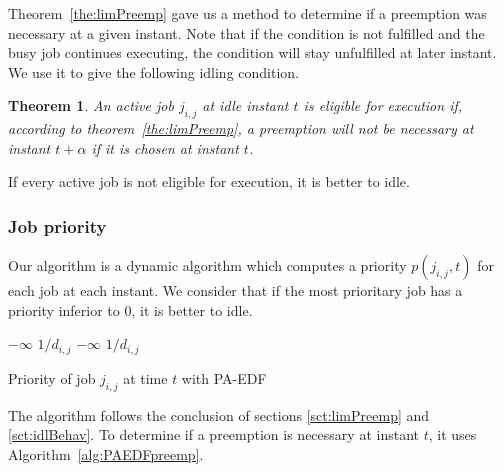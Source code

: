 \documentclass[a4paper,10pt]{article}
\newtheorem{theorem}{Theorem}
\begin{document}
        Theorem~\ref{the:limPreemp} gave us a method to determine if a preemption was necessary at a given instant. Note that if the condition is not fulfilled and the busy job continues executing, the condition will stay unfulfilled at later instant. We use it to give the following idling condition.

        \begin{theorem}
            An active job $j_{i,j}$ at idle instant $t$ is eligible for execution if, according to theorem~\ref{the:limPreemp}, a preemption will not be necessary at instant $t + \alpha$ if it is chosen at instant $t$.
        \end{theorem}

        If every active job is not eligible for execution, it is better to idle.

    \subsubsection{Job priority}

        Our algorithm is a dynamic algorithm which computes a priority $p(j_{i,j}, t)$ for each job at each instant. We consider that if the most prioritary job has a priority inferior to 0, it is better to idle.

        \begin{algorithm}[H]
            \begin{algorithmic}[1]
                        \RETURN $- \infty$
                    \ELSE
                        \RETURN $1 / d_{i,j}$
                    \ENDIF
                        \RETURN $- \infty$
                    \ELSE
                    \ENDIF
                \ENDIF
                \RETURN $1 / d_{i,j}$
            \end{algorithmic}
                \caption{Priority of job $j_{i,j}$ at time $t$ with PA-EDF}
                \label{alg:prio}
            \end{algorithm}

        The algorithm follows the conclusion of sections \ref{sct:limPreemp} and \ref{sct:idlBehav}. To determine if a preemption is necessary at instant $t$, it uses Algorithm~\ref{alg:PAEDFpreemp}.
\end{document}
